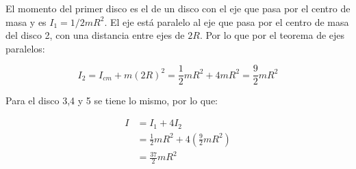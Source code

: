 \documentclass[a4paper,11pt]{article}
\theoremstyle{mytheor}
\begin{document}
El momento del primer disco es el de un disco con el eje que pasa por el centro de masa y es $I_1 = 1/2 m R^2$. El eje está paralelo al eje que pasa por el centro de masa del disco 2, con una distancia entre ejes de $2R$. Por lo que por el teorema de ejes paralelos:

$$ I_2 = I_{cm}  + m(2R)^2 = \frac{1}{2} mR^2 + 4 mR^2 = \frac{9}{2} m R^2$$

Para el disco 3,4 y 5 se tiene lo mismo, por lo que:

\begin{align*}
I &= I_1 + 4 I_2 \\
&= \frac{1}{2} mR^2 + 4 \left(\frac{9}{2} m R^2\right)\\
& = \frac{37}{2} m R^2 
\end{align*}
\end{document}
